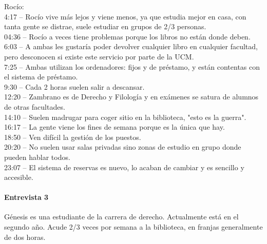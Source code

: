 \documentclass[12pt]{article}
\begin{document}
Rocío:\\
4:17 – Rocío vive más lejos y viene menos, ya que estudia mejor en casa, con tanta gente se distrae, suele estudiar en grupos de 2/3 personas.\\
04:36 – Rocío a veces tiene problemas porque los libros no están donde deben.\\
6:03 – A ambas les gustaría poder devolver cualquier libro en cualquier facultad, pero desconocen si existe este servicio por parte de la UCM.\\
7:25 – Ambas utilizan los ordenadores: fijos y de préstamo, y están contentas con el sistema de préstamo.\\
9:30 – Cada 2 horas suelen salir a descansar.\\
12:20 – Zambrano es de Derecho y Filología y en exámenes se satura de alumnos de otras facultades.\\
14:10 – Suelen madrugar para coger sitio en la biblioteca, "esto es la guerra".\\
16:17 – La gente viene los fines de semana porque es la única que hay.\\
18:50 – Ven difícil la gestión de los puestos.\\
20:20 – No suelen usar salas privadas sino zonas de estudio en grupo donde pueden hablar todos. \\
23:07 – El sistema de reservas es nuevo, lo acaban de cambiar y es sencillo y accesible.\\

\paragraph{Entrevista 3}

Génesis es una estudiante de la carrera de  derecho. Actualmente está en el segundo año. Acude 2/3 veces por semana a la biblioteca, en franjas generalmente de dos horas.\\
\end{document}
